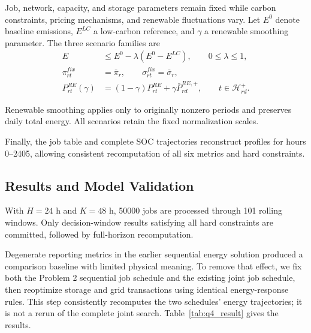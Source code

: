 Job, network, capacity, and storage parameters remain fixed while carbon constraints, pricing mechanisms, and renewable fluctuations vary. Let $E^0$ denote baseline emissions, $E^{LC}$ a low-carbon reference, and $\gamma$ a renewable smoothing parameter. The three scenario families are
\begin{equation}
	\begin{aligned}
		E
		&\leq
		E^0-\lambda(E^0-E^{LC}),
		\qquad 0\leq\lambda\leq1,\\
		\pi_{rt}^{fix}
		&=\bar{\pi}_r,
		\qquad
		\sigma_{rt}^{fix}=\bar{\sigma}_r,\\
		P_{rt}^{RE}(\gamma)
		&=
		(1-\gamma)P_{rt}^{RE}
		+\gamma\bar P_{rd}^{RE,+},
		\qquad
		t\in\mathcal H_{rd}^{+}.
	\end{aligned}
	\label{eq:q4_scenarios}
\end{equation}

Renewable smoothing applies only to originally nonzero periods and preserves daily total energy. All scenarios retain the fixed normalization scales.

Finally, the job table and complete SOC trajectories reconstruct profiles for hours 0--2405, allowing consistent recomputation of all six metrics and hard constraints.

\subsection{Results and Model Validation}

With $H=24$ h and $K=48$ h, 50000 jobs are processed through 101 rolling windows. Only decision-window results satisfying all hard constraints are committed, followed by full-horizon recomputation.

Degenerate reporting metrics in the earlier sequential energy solution produced a comparison baseline with limited physical meaning. To remove that effect, we fix both the Problem 2 sequential job schedule and the existing joint job schedule, then reoptimize storage and grid transactions using identical energy-response rules. This step consistently recomputes the two schedules' energy trajectories; it is not a rerun of the complete joint search. Table~\ref{tab:q4_result} gives the results.


